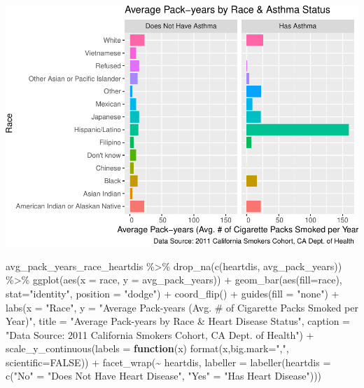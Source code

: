 \documentclass[
]{article}
\newenvironment{Shaded}{\begin{snugshade}}{\end{snugshade}}
\newcommand{\AttributeTok}[1]{\textcolor[rgb]{0.77,0.63,0.00}{#1}}
\newcommand{\ConstantTok}[1]{\textcolor[rgb]{0.00,0.00,0.00}{#1}}
\newcommand{\ControlFlowTok}[1]{\textcolor[rgb]{0.13,0.29,0.53}{\textbf{#1}}}
\newcommand{\FunctionTok}[1]{\textcolor[rgb]{0.00,0.00,0.00}{#1}}
\newcommand{\NormalTok}[1]{#1}
\newcommand{\OtherTok}[1]{\textcolor[rgb]{0.56,0.35,0.01}{#1}}
\newcommand{\SpecialCharTok}[1]{\textcolor[rgb]{0.00,0.00,0.00}{#1}}
\newcommand{\StringTok}[1]{\textcolor[rgb]{0.31,0.60,0.02}{#1}}
\begin{document}
\includegraphics{Milestone_4_files/figure-latex/bar graph of cigarette pack-years by race and asthma-1.pdf}
\newpage

\begin{Shaded}
\begin{Highlighting}[]
\NormalTok{avg\_pack\_years\_race\_heartdis }\SpecialCharTok{\%\textgreater{}\%}
  \FunctionTok{drop\_na}\NormalTok{(}\FunctionTok{c}\NormalTok{(heartdis, avg\_pack\_years)) }\SpecialCharTok{\%\textgreater{}\%}
  \FunctionTok{ggplot}\NormalTok{(}\FunctionTok{aes}\NormalTok{(}\AttributeTok{x =}\NormalTok{ race, }\AttributeTok{y =}\NormalTok{ avg\_pack\_years)) }\SpecialCharTok{+}
  \FunctionTok{geom\_bar}\NormalTok{(}\FunctionTok{aes}\NormalTok{(}\AttributeTok{fill=}\NormalTok{race), }\AttributeTok{stat=}\StringTok{"identity"}\NormalTok{, }\AttributeTok{position =} \StringTok{"dodge"}\NormalTok{) }\SpecialCharTok{+}
  \FunctionTok{coord\_flip}\NormalTok{() }\SpecialCharTok{+}
  \FunctionTok{guides}\NormalTok{(}\AttributeTok{fill =} \StringTok{"none"}\NormalTok{) }\SpecialCharTok{+}
  \FunctionTok{labs}\NormalTok{(}\AttributeTok{x =} \StringTok{"Race"}\NormalTok{,}
       \AttributeTok{y =} \StringTok{"Average Pack{-}years (Avg. \# of Cigarette Packs Smoked per Year)"}\NormalTok{,}
  \AttributeTok{title =} \StringTok{"Average Pack{-}years by Race \& Heart Disease Status"}\NormalTok{,}
  \AttributeTok{caption =} \StringTok{"Data Source: 2011 California Smokers Cohort, CA Dept. of Health"}\NormalTok{) }\SpecialCharTok{+}
  \FunctionTok{scale\_y\_continuous}\NormalTok{(}\AttributeTok{labels =} \ControlFlowTok{function}\NormalTok{(x) }\FunctionTok{format}\NormalTok{(x,}\AttributeTok{big.mark=}\StringTok{","}\NormalTok{,}
                                                     \AttributeTok{scientific=}\ConstantTok{FALSE}\NormalTok{)) }\SpecialCharTok{+}
  \FunctionTok{facet\_wrap}\NormalTok{(}\SpecialCharTok{\textasciitilde{}}\NormalTok{ heartdis, }\AttributeTok{labeller =} \FunctionTok{labeller}\NormalTok{(}\AttributeTok{heartdis =}
                                      \FunctionTok{c}\NormalTok{(}\StringTok{"No"} \OtherTok{=} \StringTok{"Does Not Have Heart Disease"}\NormalTok{,}
                                        \StringTok{"Yes"} \OtherTok{=} \StringTok{"Has Heart Disease"}\NormalTok{)))}
\end{Highlighting}
\end{Shaded}
\end{document}
